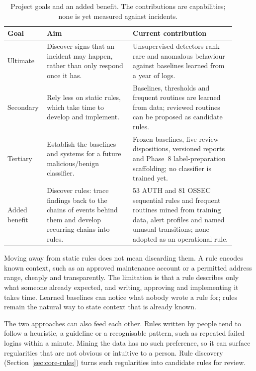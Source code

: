 \documentclass[11pt,a4paper]{article}
\begin{document}
\begin{table}[H]
\centering\small
\begin{tabular}{p{0.12\linewidth}p{0.36\linewidth}p{0.43\linewidth}}
\toprule
\textbf{Goal} & \textbf{Aim} & \textbf{Current contribution} \\
\midrule
Ultimate & Discover signs that an incident may happen, rather than only respond once it has. & Unsupervised detectors rank rare and anomalous behaviour against baselines learned from a year of logs. \\
Secondary & Rely less on static rules, which take time to develop and implement. & Baselines, thresholds and frequent routines are learned from data; reviewed routines can be proposed as candidate rules. \\
Tertiary & Establish the baselines and systems for a future malicious/benign classifier. & Frozen baselines, five review dispositions, versioned reports and Phase~8 label-preparation scaffolding; no classifier is trained yet. \\
Added benefit & Discover rules: trace findings back to the chains of events behind them and develop recurring chains into rules. & 53 AUTH and 81 OSSEC sequential rules and frequent routines mined from training data, alert profiles and named unusual transitions; none adopted as an operational rule. \\
\bottomrule
\end{tabular}
\caption{Project goals and an added benefit. The contributions are capabilities; none is yet measured against incidents.}
\label{tab:core-goals}
\end{table}

Moving away from static rules does not mean discarding them. A rule encodes known context, such as an approved maintenance account or a permitted address range, cheaply and transparently. The limitation is that a rule describes only what someone already expected, and writing, approving and implementing it takes time. Learned baselines can notice what nobody wrote a rule for; rules remain the natural way to state context that is already known.

The two approaches can also feed each other. Rules written by people tend to follow a heuristic, a guideline or a recognisable pattern, such as repeated failed logins within a minute. Mining the data has no such preference, so it can surface regularities that are not obvious or intuitive to a person. Rule discovery (Section~\ref{sec:core-rules}) turns such regularities into candidate rules for review.
\end{document}
